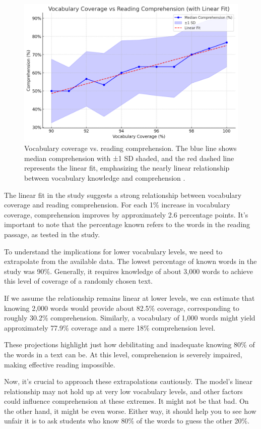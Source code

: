 \begin{figure}
    \centering
    \includegraphics[width=0.8\linewidth]{figures/VocabCoverage.png}
    \caption{Vocabulary coverage vs. reading comprehension. The blue line shows median comprehension with ±1 SD shaded, and the red dashed line represents the linear fit, emphasizing the nearly linear relationship between vocabulary knowledge and comprehension \citep{Schmitt2011}.}
    \label{fig:Schmitt2011}
\end{figure}

The linear fit in the study suggests a strong relationship between vocabulary coverage and reading comprehension. For each 1\% increase in vocabulary coverage, comprehension improves by approximately 2.6 percentage points. It's important to note that the percentage known refers to the words in the reading passage, as tested in the study.

To understand the implications for lower vocabulary levels, we need to extrapolate from the available data. The lowest percentage of known words in the study was 90\%. Generally, it requires knowledge of about 3,000 words to achieve this level of coverage of a randomly chosen text. 

If we assume the relationship remains linear at lower levels, we can estimate that knowing 2,000 words would provide about 82.5\% coverage, corresponding to roughly 30.2\% comprehension. Similarly, a vocabulary of 1,000 words might yield approximately 77.9\% coverage and a mere 18\% comprehension level.

These projections highlight just how debilitating and inadequate knowing 80\% of the words in a text can be. At this level, comprehension is severely impaired, making effective reading impossible. 

Now, it's crucial to approach these extrapolations cautiously. The model's linear relationship may not hold up at very low vocabulary levels, and other factors could influence comprehension at these extremes. It might not be that bad. On the other hand, it might be even worse. Either way, it should help you to see how unfair it is to ask students who know 80\% of the words to guess the other 20\%.

